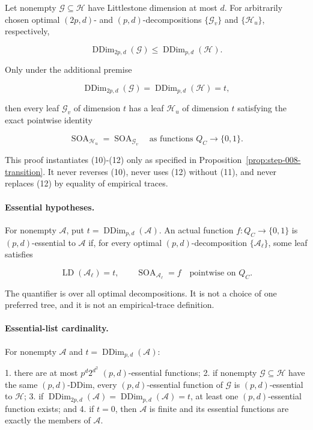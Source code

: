 Let nonempty \(\mathcal G\subseteq\mathcal H\) have Littlestone dimension
at most \(d\). For arbitrarily chosen optimal \((2p,d)\)- and
\((p,d)\)-decompositions \(\{\mathcal G_v\}\) and
\(\{\mathcal H_u\}\), respectively,

\[
 \operatorname{DDim}_{2p,d}(\mathcal G)
 \le \operatorname{DDim}_{p,d}(\mathcal H).
\tag{10}
\]

Only under the additional premise

\[
 \operatorname{DDim}_{2p,d}(\mathcal G)
 =\operatorname{DDim}_{p,d}(\mathcal H)=t,
\tag{11}
\]

then every leaf \(\mathcal G_v\) of dimension \(t\) has a leaf
\(\mathcal H_u\) of dimension \(t\) satisfying the exact pointwise
identity

\[
 \operatorname{SOA}_{\mathcal H_u}
 =\operatorname{SOA}_{\mathcal G_v}
 \quad\text{as functions }Q_C\to\{0,1\}.
\tag{12}
\]

This proof instantiates (10)-(12) only as specified in
Proposition~\ref{prop:step-008-transition}. It never reverses (10), never
uses (12) without (11), and never replaces (12) by equality of empirical
traces.

\paragraph{Essential hypotheses.}

For nonempty \(\mathcal A\), put
\(t=\operatorname{DDim}_{p,d}(\mathcal A)\). An actual function
\(f:Q_C\to\{0,1\}\) is \((p,d)\)-essential to \(\mathcal A\) if, for every
optimal \((p,d)\)-decomposition \(\{\mathcal A_\ell\}\), some leaf satisfies

\[
 \operatorname{LD}(\mathcal A_\ell)=t,
 \qquad
 \operatorname{SOA}_{\mathcal A_\ell}=f
 \quad\text{pointwise on }Q_C.
\tag{13}
\]

The quantifier is over all optimal decompositions. It is not a choice of
one preferred tree, and it is not an empirical-trace definition.

\paragraph{Essential-list cardinality.}

For nonempty \(\mathcal A\) and
\(t=\operatorname{DDim}_{p,d}(\mathcal A)\):

1. there are at most \(p^d2^{d^2}\) \((p,d)\)-essential functions;
2. if nonempty \(\mathcal G\subseteq\mathcal H\) have the same
   \((p,d)\)-DDim, every \((p,d)\)-essential function of \(\mathcal G\)
   is \((p,d)\)-essential to \(\mathcal H\);
3. if
   \(\operatorname{DDim}_{2p,d}(\mathcal A)
     =\operatorname{DDim}_{p,d}(\mathcal A)=t\),
   at least one \((p,d)\)-essential function exists; and
4. if \(t=0\), then \(\mathcal A\) is finite and its essential functions
   are exactly the members of \(\mathcal A\).

